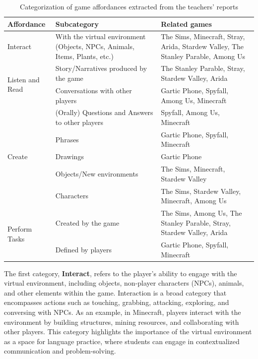 \documentclass[english]{textolivre}
\begin{document}
\begin{table}[h!]
\begin{threeparttable}
\caption{Categorization of game affordances extracted from the teachers’ reports}
\label{tab3}
\centering
\small
\begin{tabular}{p{3cm}p{}p{}}
\hline
Affordance & Subcategory & Related games \\
\hline

\multirow{1}{*}{Interact} &
With the virtual environment (Objects, NPCs, Animals, Items, Plants, etc.) &
The Sims, Minecraft, Stray, Arida, Stardew Valley, The Stanley Parable, Among Us \\
\hline

\multirow{2}{*}{Listen and Read} &
Story/Narratives produced by the game &
The Stanley Parable, Stray, Stardew Valley, Arida \\

&
Conversations with other players &
Gartic Phone, Spyfall, Among Us, Minecraft \\
\hline

\multirow{5}{*}{Create} &
(Orally) Questions and Answers to other players &
Spyfall, Among Us, Minecraft \\

&
Phrases &
Gartic Phone, Spyfall, Minecraft \\

&
Drawings &
Gartic Phone \\

&
Objects/New environments &
The Sims, Minecraft, Stardew Valley \\

&
Characters &
The Sims, Stardew Valley, Minecraft, Among Us \\
\hline

\multirow{2}{*}{Perform Tasks} &
Created by the game &
The Sims, Among Us, The Stanley Parable, Stray, Stardew Valley, Arida \\

&
Defined by players &
Gartic Phone, Spyfall, Minecraft \\
\hline

\end{tabular}

\vspace{0.3cm}

\footnotesize
{}
\end{threeparttable}
\end{table}

The first category, \textbf{Interact}, refers to the player’s ability to engage with the virtual environment, including objects, non-player characters (NPCs), animals, and other elements within the game. Interaction is a broad category that encompasses actions such as touching, grabbing, attacking, exploring, and conversing with NPCs. As an example, in Minecraft, players interact with the environment by building structures, mining resources, and collaborating with other players. This category highlights the importance of the virtual environment as a space for language practice, where students can engage in contextualized communication and problem-solving.
\end{document}
